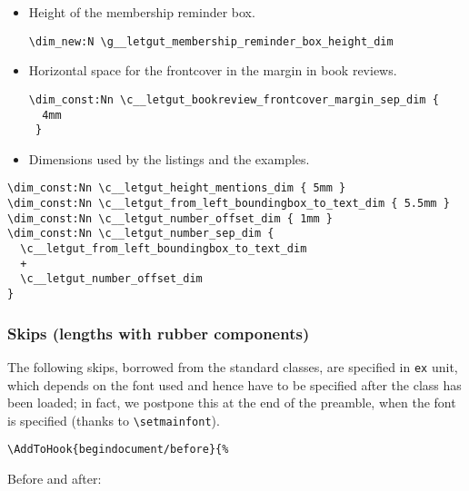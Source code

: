 \documentclass{letgut}
\begin{document}
\begin{itemize}
\begin{itemize}
\begin{lstlisting}
\end{lstlisting}
\item Height of the “L” (that of the text area plus 3cm).
\begin{lstlisting}
\dim_const:Nn \c__letgut_banner_height_dim  {
  \c__letgut_textheight_dim
  +
  3cm
}
\end{lstlisting}
\end{itemize}
\item Height of the membership reminder box.
\begin{lstlisting}
\dim_new:N \g__letgut_membership_reminder_box_height_dim
\end{lstlisting}
\item Horizontal space for the frontcover in the margin in book reviews.
\begin{lstlisting}
\dim_const:Nn \c__letgut_bookreview_frontcover_margin_sep_dim {
  4mm
 }
\end{lstlisting}
\item Dimensions used by the listings and the examples.
\end{itemize}
\begin{lstlisting}
\dim_const:Nn \c__letgut_height_mentions_dim { 5mm }
\dim_const:Nn \c__letgut_from_left_boundingbox_to_text_dim { 5.5mm }
\dim_const:Nn \c__letgut_number_offset_dim { 1mm }
\dim_const:Nn \c__letgut_number_sep_dim {
  \c__letgut_from_left_boundingbox_to_text_dim
  +
  \c__letgut_number_offset_dim
}
\end{lstlisting}

\subsubsection{Skips (lengths with rubber components)}
\label{ImplementationDeclarationsSkipslengthswithrubbercomponents-a4ag55h0jlj0}
The following skips, borrowed from the standard classes, are specified in
\lstinline+ex+ unit, which depends on the font used and hence have to be specified
after the class has been loaded; in fact, we postpone this at the end of the
preamble, when the font is specified (thanks to \lstinline+\setmainfont+).

\begin{lstlisting}
\AddToHook{begindocument/before}{%
\end{lstlisting}

Before and after:
\end{document}
